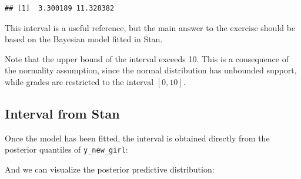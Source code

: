 \documentclass[
  english,
  12pt,
]{article}
\newenvironment{Shaded}{\begin{snugshade}}{\end{snugshade}}
\newcommand{\AttributeTok}[1]{\textcolor[rgb]{0.13,0.29,0.53}{#1}}
\newcommand{\DecValTok}[1]{\textcolor[rgb]{0.00,0.00,0.81}{#1}}
\newcommand{\FloatTok}[1]{\textcolor[rgb]{0.00,0.00,0.81}{#1}}
\newcommand{\FunctionTok}[1]{\textcolor[rgb]{0.13,0.29,0.53}{\textbf{#1}}}
\newcommand{\NormalTok}[1]{#1}
\newcommand{\OtherTok}[1]{\textcolor[rgb]{0.56,0.35,0.01}{#1}}
\newcommand{\SpecialCharTok}[1]{\textcolor[rgb]{0.81,0.36,0.00}{\textbf{#1}}}
\newcommand{\StringTok}[1]{\textcolor[rgb]{0.31,0.60,0.02}{#1}}
\begin{document}
\begin{verbatim}
## [1]  3.300189 11.328382
\end{verbatim}

This interval is a useful reference, but the main answer to the exercise
should be based on the Bayesian model fitted in Stan.

Note that the upper bound of the interval exceeds 10. This is a
consequence of the normality assumption, since the normal distribution
has unbounded support, while grades are restricted to the interval
\([0,10]\).

\subsection{Interval from Stan}\label{interval-from-stan}

Once the model has been fitted, the interval is obtained directly from
the posterior quantiles of \texttt{y\_new\_girl}:

\begin{Shaded}
\end{Shaded}

And we can visualize the posterior predictive distribution:

\begin{Shaded}
\end{Shaded}
\end{document}
